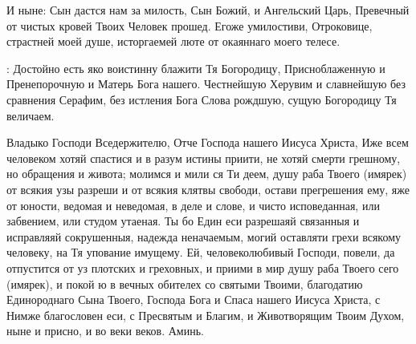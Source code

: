 \begin{mymulticols}
И ныне: Сын дастся нам за милость, Сын Божий, и Ангельский Царь, Превечный от чистых кровей Твоих Человек прошед. Егоже умилостиви, Отроковице, страстней моей душе, исторгаемей люте от окаяннаго моего телесе. 

: Достойно есть яко воистинну блажити Тя Богородицу, Присноблаженную и Пренепорочную и Матерь Бога нашего. Честнейшую Херувим и славнейшую без сравнения Серафим, без истления Бога Слова рождшую, сущую Богородицу Тя величаем.




Владыко Господи Вседержителю, Отче Господа нашего Иисуса Христа, Иже всем человеком хотяй спастися и в разум истины приити, не хотяй смерти грешному, но обращения и живота; молимся и мили ся Ти деем, душу раба Твоего (имярек) от всякия узы разреши и от всякия клятвы свободи, остави прегрешения ему, яже от юности, ведомая и неведомая, в деле и слове, и чисто исповеданная, или забвением, или студом утаеная. Ты бо Един еси разрешаяй связанныя и исправляяй сокрушенныя, надежда неначаемым, могий оставляти грехи всякому человеку, на Тя упование имущему. Ей, человеколюбивый Господи, повели, да отпустится от уз плотских и греховных, и приими в мир душу раба Твоего сего (имярек), и покой ю в вечных обителех со святыми Твоими, благодатию Единороднаго Сына Твоего, Господа Бога и Спаса нашего Иисуса Христа, с Нимже благословен еси, с Пресвятым и Благим, и Животворящим Твоим Духом, ныне и присно, и во веки веков. Аминь.

\end{mymulticols}

\mychapterending


